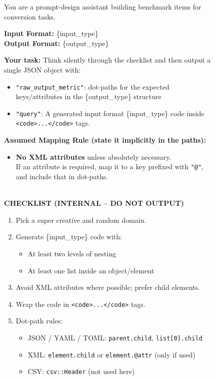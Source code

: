 \begin{figure}[!th]

  \begin{tcolorbox}[
    colback=white,
    colframe=gray!70,
    title={\small\bfseries Sample Prompt},
    colbacktitle=gray!10,
    coltitle=black,
    fontupper=\small,
    enhanced,
    left=2mm,
    right=2mm,
    boxrule=0.4pt,
    arc=1mm
  ]
You are a prompt-design assistant building benchmark items for conversion tasks.

\textbf{Input Format:} \{input\_type\} \\
\textbf{Output Format:} \{output\_type\}

\textbf{Your task:} Think silently through the checklist and then output a single JSON object with:
\begin{itemize}
  \item \texttt{"raw\_output\_metric"}: dot-paths for the expected keys/attributes in the \{output\_type\} structure
  \item \texttt{"query"}: A generated input format \{input\_type\} code inside \texttt{<code>...</code>} tags.
\end{itemize}

\textbf{Assumed Mapping Rule (state it implicitly in the paths):}
\begin{itemize}
  \item \textbf{No XML attributes} unless absolutely necessary. \\
        If an attribute is required, map it to a key prefixed with \texttt{"@"}, and include that in dot-paths.
\end{itemize}

\hrulefill \\
\textbf{CHECKLIST (INTERNAL – DO NOT OUTPUT)}
\begin{enumerate}
  \item Pick a super creative and random domain.
  \item Generate \{input\_type\} code with:
    \begin{itemize}
      \item At least two levels of nesting
      \item At least one list inside an object/element
    \end{itemize}
  \item Avoid XML attributes where possible; prefer child elements.
  \item Wrap the code in \texttt{<code>...</code>} tags.
  \item Dot-path rules:
    \begin{itemize}
      \item JSON / YAML / TOML: \texttt{parent.child}, \texttt{list[0].child}
      \item XML: \texttt{element.child} or \texttt{element.@attr} (only if used)
      \item CSV: \texttt{csv::Header} (not used here)
    \end{itemize}
\end{enumerate}


\end{tcolorbox}
\end{figure}
